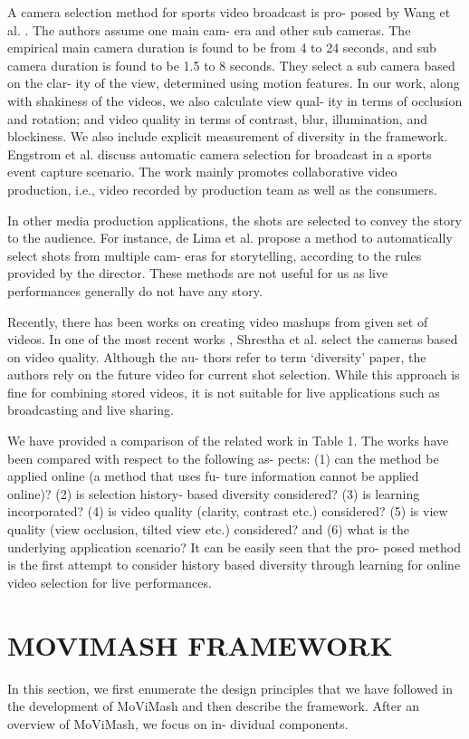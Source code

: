 \documentclass[conference]{IEEEtran}
\begin{document}
A camera selection method for sports video broadcast is pro-
posed by Wang et al. \cite{16}. The authors assume one main cam-
era and other sub cameras. The empirical main camera duration is
found to be from 4 to 24 seconds, and sub camera duration is found
to be 1.5 to 8 seconds. They select a sub camera based on the clar-
ity of the view, determined using motion features. In our work,
along with shakiness of the videos, we also calculate view qual-
ity in terms of occlusion and rotation; and video quality in terms
of contrast, blur, illumination, and blockiness. We also include
explicit measurement of diversity in the framework. Engstrom et
al. \cite{8} discuss automatic camera selection for broadcast in a sports
event capture scenario. The work mainly promotes collaborative
video production, i.e., video recorded by production team as well
as the consumers.

In other media production applications, the shots are selected to
convey the story to the audience. For instance, de Lima et al. \cite{7} propose a method to automatically select shots from multiple cam-
eras for storytelling, according to the rules provided by the director.
These methods are not useful for us as live performances generally
do not have any story.

Recently, there has been works on creating video mashups from
given set of videos. In one of the most recent works \cite{15}, Shrestha
et al. select the cameras based on video quality. Although the au-
thors refer to term ‘diversity’ paper, the authors rely on the
future video for current shot selection. While this approach is fine
for combining stored videos, it is not suitable for live applications
such as broadcasting and live sharing.

We have provided a comparison of the related work in Table 1.
The works have been compared with respect to the following as-
pects: (1) can the method be applied online (a method that uses fu-
ture information cannot be applied online)? (2) is selection history-
based diversity considered? (3) is learning incorporated? (4) is
video quality (clarity, contrast etc.) considered? (5) is view quality
(view occlusion, tilted view etc.) considered? and (6) what is the
underlying application scenario? It can be easily seen that the pro-
posed method is the first attempt to consider history based diversity
through learning for online video selection for live performances.
\section{MOVIMASH FRAMEWORK} In this section, we first enumerate the design principles that we
have followed in the development of MoViMash and then describe
the framework. After an overview of MoViMash, we focus on in-
dividual components.
\end{document}
